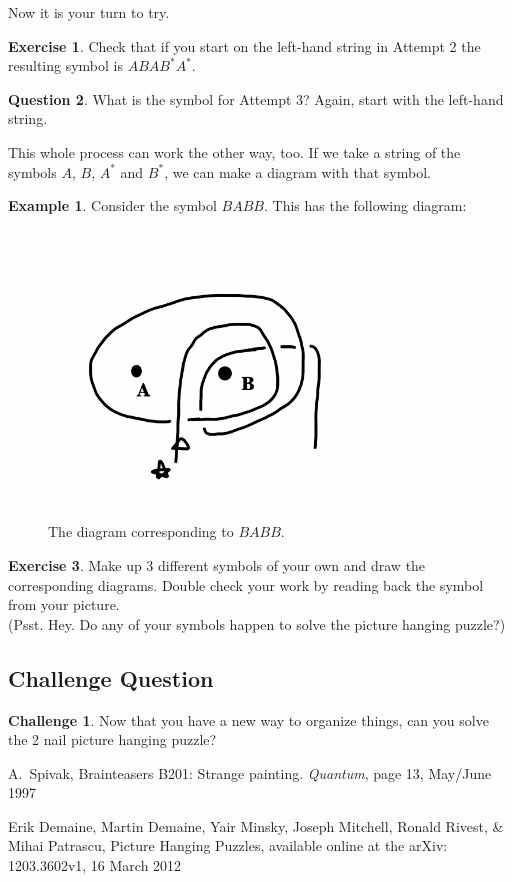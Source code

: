 \documentclass[12pt,letterpaper]{article}
\theoremstyle{definition}
\newtheorem{question}{Question}
\newtheorem{example}{Example}
\newtheorem{exercise}[question]{Exercise}
\newtheorem*{challenge}{Challenge}
\begin{document}
Now it is your turn to try.
\begin{exercise}
Check that if you start on the left-hand string in Attempt 2 the resulting symbol is $ABAB^*A^*$.
\end{exercise}

\begin{question}
What is the symbol for Attempt 3? Again, start with the left-hand string.
\end{question}

This whole process can work the other way, too.
If we take a string of the symbols $A$, $B$, $A^*$ and $B^*$, we can make a diagram with that symbol.
\begin{example} 
Consider the symbol $BABB$.
This has the following diagram:
\begin{figure}[h]
    \centering
    \includegraphics[height=3in]{phppics/code2diagr.png}
    \caption{The diagram corresponding to $BABB$.}
\end{figure}
\end{example}

\begin{exercise} Make up 3 different symbols of your own and draw the corresponding diagrams.
Double check your work by reading back the symbol from your picture.\\
(Psst. Hey. Do any of your symbols happen to solve the picture hanging puzzle?)
\end{exercise}

\subsection*{Challenge Question}

\begin{challenge}
Now that you have a new way to organize things, can you solve the 2 nail picture hanging puzzle?
\end{challenge}

\begin{thebibliography}{9}

    A.~Spivak,
    Brainteasers B201: Strange painting.
    \emph{Quantum}, page 13,
    May/June 1997

    Erik Demaine, Martin Demaine, Yair Minsky, Joseph Mitchell, Ronald Rivest, \& Mihai Patrascu,
    Picture Hanging Puzzles,
    available online at the arXiv: 1203.3602v1,
    16 March 2012
 
 \end{thebibliography}
\end{document}
